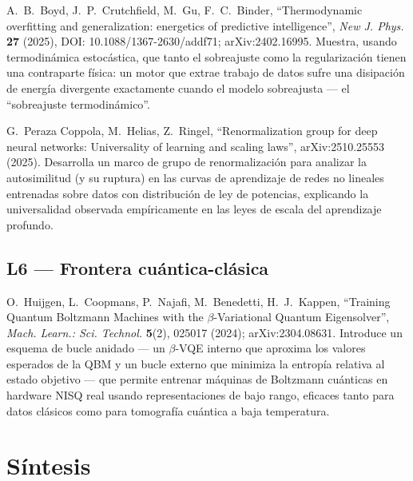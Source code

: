 \documentclass[12pt]{article}
\begin{document}
\noindent A.~B.~Boyd, J.~P.~Crutchfield, M.~Gu, F.~C.~Binder, ``Thermodynamic overfitting and generalization: energetics of predictive intelligence'', \textit{New J. Phys.} \textbf{27} (2025), DOI: 10.1088/1367-2630/addf71; arXiv:2402.16995. \cite{boyd2025}
Muestra, usando termodinámica estocástica, que tanto el sobreajuste como la regularización tienen una contraparte física: un motor que extrae trabajo de datos sufre una disipación de energía divergente exactamente cuando el modelo sobreajusta --- el ``sobreajuste termodinámico''.

\noindent G.~Peraza Coppola, M.~Helias, Z.~Ringel, ``Renormalization group for deep neural networks: Universality of learning and scaling laws'', arXiv:2510.25553 (2025). \cite{peraza2025}
Desarrolla un marco de grupo de renormalización para analizar la autosimilitud (y su ruptura) en las curvas de aprendizaje de redes no lineales entrenadas sobre datos con distribución de ley de potencias, explicando la universalidad observada empíricamente en las leyes de escala del aprendizaje profundo.

\subsection{L6 --- Frontera cuántica-clásica}

\noindent O.~Huijgen, L.~Coopmans, P.~Najafi, M.~Benedetti, H.~J.~Kappen, ``Training Quantum Boltzmann Machines with the $\beta$-Variational Quantum Eigensolver'', \textit{Mach. Learn.: Sci. Technol.} \textbf{5}(2), 025017 (2024); arXiv:2304.08631. \cite{huijgen2024}
Introduce un esquema de bucle anidado --- un $\beta$-VQE interno que aproxima los valores esperados de la QBM y un bucle externo que minimiza la entropía relativa al estado objetivo --- que permite entrenar máquinas de Boltzmann cuánticas en hardware NISQ real usando representaciones de bajo rango, eficaces tanto para datos clásicos como para tomografía cuántica a baja temperatura.

\section{Síntesis}
\end{document}
